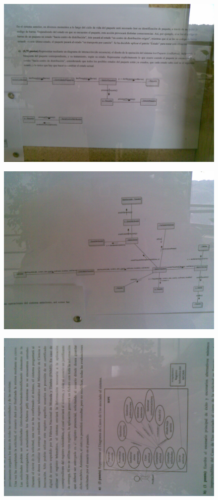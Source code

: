 \documentclass[12pt,a4paper]{report}
\begin{document}
\begin{figure}
  \includegraphics[width=\textwidth]{./images/jun/Imagen085.jpg}
\end{figure}
\begin{figure}
  \includegraphics[width=\textwidth]{./images/jun/Imagen087.jpg}
\end{figure}
\begin{figure}
  \includegraphics[width=\textwidth]{./images/jun/Imagen089.jpg}
\end{figure}
\end{document}
